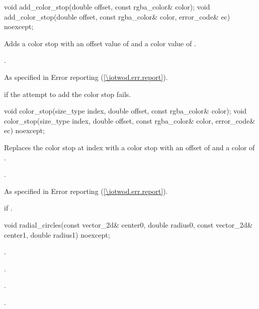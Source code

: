 \begin{itemdecl}
void add_color_stop(double offset, const rgba_color& color);
void add_color_stop(double offset, const rgba_color& color,
  error_code& ec) noexcept;
\end{itemdecl}
\begin{itemdescr}
\pnum
\effects
Adds a color stop with an offset value of  and a color value of .

\pnum
\postconditions
{}.

\pnum
\throws
As specified in Error reporting (\ref{\iotwod.err.report}).

\pnum
\errors
{} if the attempt to add the color stop fails.
\end{itemdescr}

\begin{itemdecl}
void color_stop(size_type index, double offset, const rgba_color& color);
void color_stop(size_type index, double offset, const rgba_color& color,
  error_code& ec) noexcept;
\end{itemdecl}
\begin{itemdescr}
\pnum
\effects
Replaces the color stop at index  with a color stop with an offset of  and a color of .

\pnum
\postconditions
{}.

\pnum
\throws
As specified in Error reporting (\ref{\iotwod.err.report}).

\pnum
\errors
{} if .
\end{itemdescr}

\begin{itemdecl}
void radial_circles(const vector_2d& center0, double radius0,
  const vector_2d& center1, double radius1) noexcept;
\end{itemdecl}
\begin{itemdescr}
\pnum
\postconditions
{}.

\pnum
{}.

\pnum
{}.

\pnum
{}.
\end{itemdescr}


